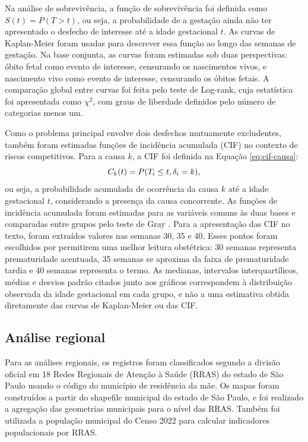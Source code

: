 Na análise de sobrevivência, a função de sobrevivência foi definida como $S(t)=P(T>t)$, 
ou seja, a probabilidade de a gestação ainda não ter apresentado o desfecho de interesse 
até a idade gestacional $t$. As curvas de Kaplan-Meier foram usadas para descrever 
essa função ao longo das semanas de gestação. Na base conjunta, as curvas foram 
estimadas sob duas perspectivas: óbito fetal como evento de interesse, censurando 
os nascimentos vivos, e nascimento vivo como evento de interesse, censurando os 
óbitos fetais. A comparação global entre curvas foi feita pelo teste de Log-rank, 
cuja estatística foi apresentada como $\chi^2$, com graus de liberdade definidos 
pelo número de categorias menos um.

Como o problema principal envolve dois desfechos mutuamente excludentes, também
foram estimadas funções de incidência acumulada (CIF) no contexto de riscos 
competitivos. Para a causa $k$, a CIF foi definida na Equação \ref{eq:cif-causa}:
\begin{equation}
\lequation{Função de incidência acumulada por causa}
\label{eq:cif-causa}
C_k(t)=P(T_i\leq t,\delta_i=k),
\end{equation}
ou seja, a probabilidade acumulada de ocorrência da causa $k$ até a idade
gestacional $t$, considerando a presença da causa concorrente. As funções 
de incidência acumulada foram estimadas para as variáveis comuns às duas bases 
e comparadas entre grupos pelo teste de Gray \cite{gray1988class}. 
Para a apresentação das CIF no texto, foram extraídos valores nas semanas 30, 35 
e 40. Esses pontos foram escolhidos por permitirem uma melhor leitura obstétrica: 
30 semanas representa prematuridade acentuada, 35 semanas se aproxima da faixa 
de prematuridade tardia e 40 semanas representa o termo. As medianas, intervalos 
interquartílicos, médias e desvios padrão citados junto aos gráficos correspondem 
à distribuição observada da idade gestacional em cada grupo, e não a uma estimativa 
obtida diretamente das curvas de Kaplan-Meier ou das CIF.

\subsection{Análise regional}

Para as análises regionais, os registros foram classificados segundo a divisão 
oficial em 18 Redes Regionais de Atenção à Saúde (RRAS) do estado de São Paulo 
usando o código do município de residência da mãe. Os mapas foram construídos 
a partir do shapefile municipal do estado de São Paulo, e foi realizado a agregação 
das geometrias municipais para o nível das RRAS. Também foi utilizada a população 
municipal do Censo 2022 para calcular indicadores populacionais por RRAS.


